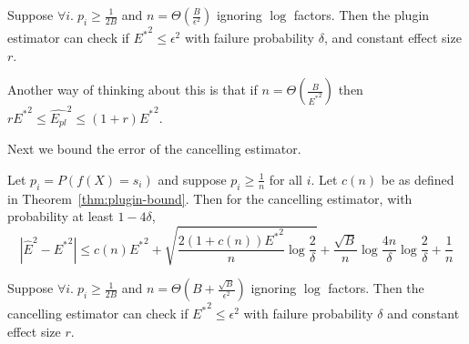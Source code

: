 \begin{theorem}
\label{thm:final-plugin}
  Suppose  $\forall i.\;p_i \geq \frac{1}{2B}$ and $n = \Theta(\frac{B}{\epsilon^2})$ ignoring $\log$ factors. Then the plugin estimator can check if ${E^*}^2 \leq \epsilon^2$ with failure probability $\delta$, and constant effect size $r$. 
\end{theorem}

Another way of thinking about this is that if $n = \Theta(\frac{B}{{E^*}^2})$ then  $r {E^*}^2 \leq \hat{E_{pl}}^2 \leq (1+r){E^*}^2$.

Next we bound the error of the cancelling estimator.



\begin{theorem}
\label{thm:our-bound}
Let $p_i = P(f(X) = s_i)$ and suppose $p_i \geq \frac{1}{n}$ for all $i$. Let $c(n)$ be as defined in Theorem~\ref{thm:plugin-bound}.
Then for the cancelling estimator, with probability at least $1 - 4\delta$,
\[ | \hat{E}^2 - {E^*}^2 | \leq c(n){E^*}^2 + \sqrt{\frac{2(1+c(n)){E^*}^2}{n} \log{\frac{2}{\delta}}} + \frac{\sqrt{B}}{n}\log{\frac{4n}{\delta}} \log{\frac{2}{\delta}} + \frac{1}{n}\]
\end{theorem}

\begin{theorem}
\label{thm:final-ours}
Suppose $\forall i.\;p_i \geq \frac{1}{2B}$ and $n = \Theta(B+\frac{\sqrt{B}}{\epsilon^2})$ ignoring $\log$ factors. Then the cancelling estimator can check if ${E^*}^2 \leq \epsilon^2$ with failure probability $\delta$ and constant effect size $r$. 
\end{theorem}


